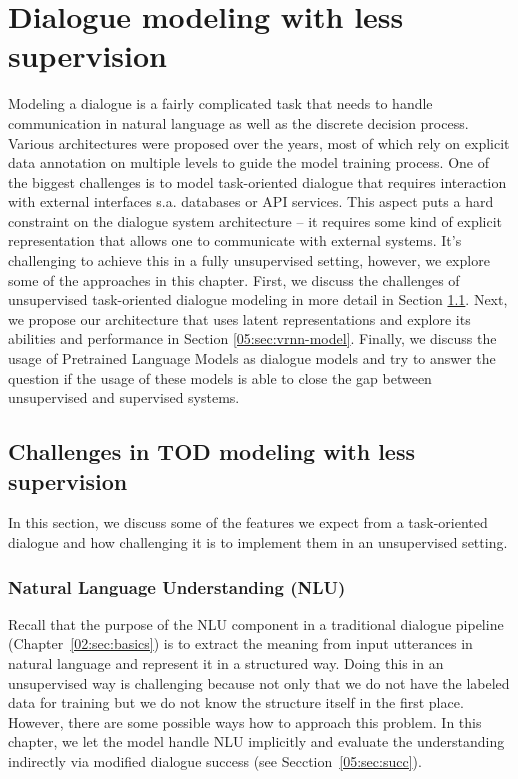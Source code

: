\chapter{Dialogue modeling with less supervision}%
\label{chap:modeling}
Modeling a dialogue is a fairly complicated task that needs to handle communication in natural language as well as the discrete decision process.
Various architectures were proposed over the years, most of which rely on explicit data annotation on multiple levels to guide the model training process.
One of the biggest challenges is to model task-oriented dialogue that requires interaction with external interfaces s.a. databases or API services.
This aspect puts a hard constraint on the dialogue system architecture -- it requires some kind of explicit representation that allows one to communicate with external systems.
It's challenging to achieve this in a fully unsupervised setting, however, we explore some of the approaches in this chapter.
First, we discuss the challenges of unsupervised task-oriented dialogue modeling in more detail in Section \ref{05:sec:to-unsup}.
Next, we propose our architecture that uses latent representations and explore its abilities and performance in Section \ref{05:sec:vrnn-model}.
Finally, we discuss the usage of Pretrained Language Models as dialogue models and try to answer the question if the usage of these models is able to close the gap between unsupervised and supervised systems.

\section{Challenges in TOD modeling with less supervision}
\label{05:sec:to-unsup}
In this section, we discuss some of the features we expect from a task-oriented dialogue and how challenging it is to implement them in an unsupervised setting.

\subsection{Natural Language Understanding (NLU)}
Recall that the purpose of the NLU component in a traditional dialogue pipeline (Chapter~\ref{02:sec:basics}) is to extract the meaning from input utterances in natural language and represent it in a structured way.
Doing this in an unsupervised way is challenging because not only that we do not have the labeled data for training but we do not know the structure itself in the first place.
However, there are some possible ways how to approach this problem.
In this chapter, we let the model handle NLU implicitly and evaluate the understanding indirectly via modified dialogue success (see Secction~\ref{05:sec:succ}).

